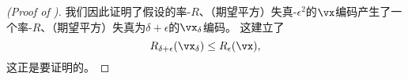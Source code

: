 \documentclass[../../book-main.tex]{subfiles}
\begin{document}
\begin{proof}[(Proof of )]
    我们因此证明了假设的率-$R$、（期望平方）失真-$\epsilon^2$的$\vx$编码产生了一个率-$R$、（期望平方）失真为$\delta + \epsilon$的$\vx_{\delta}$编码。
    这建立了
    \begin{equation}
        R_{\delta + \epsilon}(\vx_{\delta})
        \leq
        R_{\epsilon}(\vx),
    \end{equation}
    这正是要证明的。


\end{proof}
\end{document}
